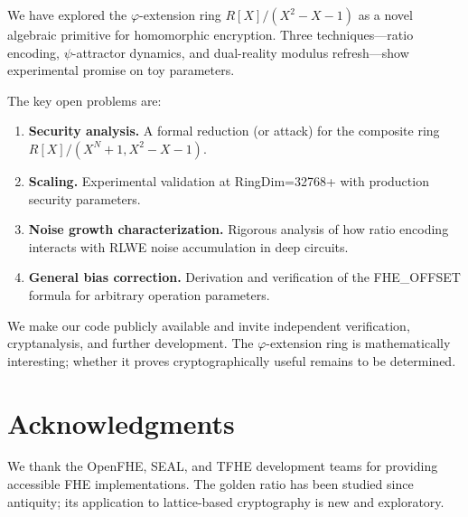 \documentclass[11pt,a4paper]{article}
\begin{document}
We have explored the $\varphi$-extension ring $R[X]/(X^2-X-1)$ as a novel algebraic primitive for homomorphic encryption. Three techniques---ratio encoding, $\psi$-attractor dynamics, and dual-reality modulus refresh---show experimental promise on toy parameters.

The key open problems are:
\begin{enumerate}
    \item \textbf{Security analysis.} A formal reduction (or attack) for the composite ring $R[X]/(X^N+1, X^2-X-1)$.
    \item \textbf{Scaling.} Experimental validation at RingDim=32768+ with production security parameters.
    \item \textbf{Noise growth characterization.} Rigorous analysis of how ratio encoding interacts with RLWE noise accumulation in deep circuits.
    \item \textbf{General bias correction.} Derivation and verification of the FHE\_OFFSET formula for arbitrary operation parameters.
\end{enumerate}

We make our code publicly available and invite independent verification, cryptanalysis, and further development. The $\varphi$-extension ring is mathematically interesting; whether it proves cryptographically useful remains to be determined.

\section*{Acknowledgments}

We thank the OpenFHE, SEAL, and TFHE development teams for providing accessible FHE implementations. The golden ratio has been studied since antiquity; its application to lattice-based cryptography is new and exploratory.
\end{document}
